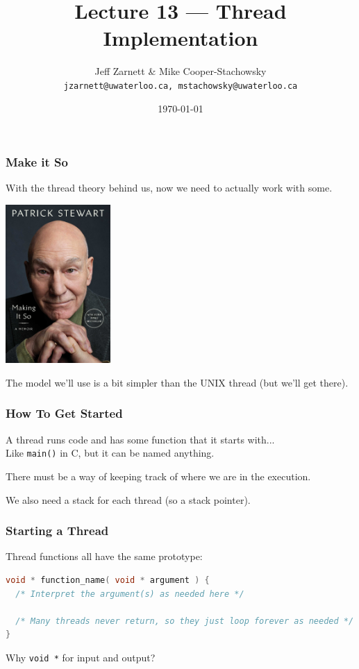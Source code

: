 


\title{Lecture 13 --- Thread Implementation }

\author{Jeff Zarnett \& Mike Cooper-Stachowsky \\ \small \texttt{jzarnett@uwaterloo.ca, mstachowsky@uwaterloo.ca}}
\date{\today}


\begin{frame}
  \titlepage
\end{frame}


\begin{frame}
\frametitle{Make it So}

With the thread theory behind us, now we need to actually work with some.

\begin{center}
	\includegraphics[width=0.3\textwidth]{images/making-it-so.jpg}
\end{center}

The model we'll use is a bit simpler than the UNIX thread (but we'll get there).

\end{frame}


\begin{frame}
\frametitle{How To Get Started}

A thread runs code and has some function that it starts with...\\
\quad Like \texttt{main()} in C, but it can be named anything.

There must be a way of keeping track of where we are in the execution.

We also need a stack for each thread (so a stack pointer).

\end{frame}


\begin{frame}[fragile]
\frametitle{Starting a Thread}

Thread functions all have the same prototype:

\begin{lstlisting}[language=C]
void * function_name( void * argument ) {
  /* Interpret the argument(s) as needed here */
 
  /* Many threads never return, so they just loop forever as needed */ 
}
\end{lstlisting}

Why \texttt{void *} for input and output?

\end{frame}


